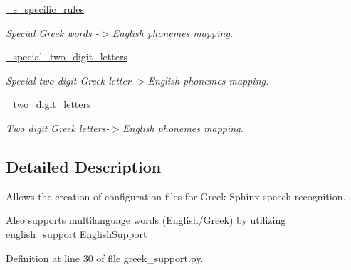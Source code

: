 \begin{DoxyCompactItemize}
\hyperlink{classrapp__speech__detection__sphinx4_1_1greek__support_1_1GreekSupport_acdc908eced1c5243b5f8cb75dae0cd8b}{\-\_\-s\-\_\-specific\-\_\-rules}
\begin{DoxyCompactList}\small\item\em Special Greek words -\/$>$English phonemes mapping. \end{DoxyCompactList}\item 
\hyperlink{classrapp__speech__detection__sphinx4_1_1greek__support_1_1GreekSupport_a556cca34cd5c3e51561b77a4ebcf7510}{\-\_\-special\-\_\-two\-\_\-digit\-\_\-letters}
\begin{DoxyCompactList}\small\item\em Special two digit Greek letter-\/$>$English phonemes mapping. \end{DoxyCompactList}\item 
\hyperlink{classrapp__speech__detection__sphinx4_1_1greek__support_1_1GreekSupport_a86a67ca628328d247fd54cefe02c4962}{\-\_\-two\-\_\-digit\-\_\-letters}
\begin{DoxyCompactList}\small\item\em Two digit Greek letters-\/$>$English phonemes mapping. \end{DoxyCompactList}\end{DoxyCompactItemize}


\subsection{Detailed Description}
Allows the creation of configuration files for Greek Sphinx speech recognition. 

Also supports multilanguage words (English/\-Greek) by utilizing \hyperlink{classrapp__speech__detection__sphinx4_1_1english__support_1_1EnglishSupport}{english\-\_\-support.\-English\-Support} 

Definition at line 30 of file greek\-\_\-support.\-py.




